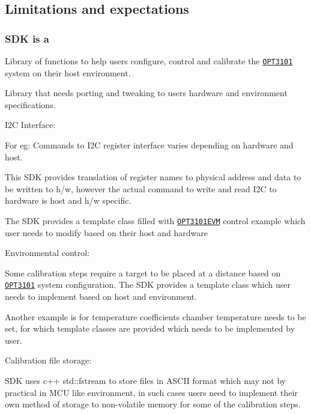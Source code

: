 \subsection*{\label{_Limitations}%
Limitations and expectations}

\subsubsection*{S\+DK is a}


\begin{DoxyItemize}
\item Library of functions to help users configure, control and calibrate the \href{http://www.ti.com/product/OPT3101}{\tt O\+P\+T3101} system on their host environment.
\item Library that needs porting and tweaking to users\textquotesingle{} hardware and environment specifications.
\begin{DoxyItemize}
\item I2C Interface\+:
\begin{DoxyItemize}
\item For eg\+: Commands to I2C register interface varies depending on hardware and host.
\item This S\+DK provides translation of register names to physical address and data to be written to h/w, however the actual command to write and read I2C to hardware is host and h/w specific.
\item The S\+DK provides a template class filled with \href{http://www.ti.com/tool/OPT3101EVM}{\tt O\+P\+T3101\+E\+VM} control example which user needs to modify based on their host and hardware
\end{DoxyItemize}
\item Environmental control\+:
\begin{DoxyItemize}
\item Some calibration steps require a target to be placed at a distance based on \href{http://www.ti.com/product/OPT3101}{\tt O\+P\+T3101} system configuration. The S\+DK provides a template class which user needs to implement based on host and environment.
\item Another example is for temperature coefficients chamber temperature needs to be set, for which template classes are provided which needs to be implemented by user.
\end{DoxyItemize}
\item Calibration file storage\+:
\begin{DoxyItemize}
\item S\+DK uses c++ std\+::fstream to store files in A\+S\+C\+II format which may not by practical in M\+CU like environment, in such cases users need to implement their own method of storage to non-\/volatile memory for some of the calibration steps.

\end{DoxyItemize}
\end{DoxyItemize}
\end{DoxyItemize}
